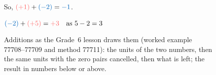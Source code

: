 \documentclass[11pt,a4paper]{article}
\theoremstyle{definition}
\newcommand\tribuNegative[2]{%
\begin{scope}[shift={(#1,#2)}]
\begin{scope}[scale=0.75]
\draw[fill=colorprop, thick] (0,0)circle(0.4);
\draw[ thick] (-0.15,0)--(0.15,0);
\end{scope}
\end{scope}
}
\newcommand\tribuPositive[2]{%

\begin{scope}[shift={(#1,#2)}]
\begin{scope}[scale=0.75]
\draw[fill=colordef, thick] (0,0)circle(0.4);
\draw[ thick] (0,-0.15)--(0,0.15);
\draw[ thick] (-0.15,0)--(0.15,0);
\end{scope}
\end{scope}
}
\newcommand\explosionForce[2]{
\begin{scope}[shift={(#1,#2)}]
  \shade[inner color=colorprop, outer color=colordef] (0,0) circle (0.3);
 \end{scope}
}
\newcommand\additionRelativeNumber[2]{
\pgfmathsetmacro{\numberFirst}{#1}
\pgfmathsetmacro{\numberFirstAbs}{int(abs(\numberFirst)}

\pgfmathsetmacro{\numberSecond}{#2}
\pgfmathsetmacro{\numberSecondAbs}{int(abs(\numberSecond)}


\pgfmathparse{ifthenelse(\numberFirst*\numberSecond>0,1,0)} 
\ifthenelse{\pgfmathresult=1}
{

\foreach \x in {1,...,\numberFirstAbs}  {
\pgfmathparse{ifthenelse(\numberFirst>0,1,0)} \ifthenelse{\pgfmathresult=1}{ 
\tribuPositive{\x*0.75}{0};
}
{
\tribuNegative{\x*0.75}{0};
}
}
\node at (\numberFirstAbs*0.75+0.65,0){$+$};

\foreach \x in {1,...,\numberSecondAbs}  {
\pgfmathsetmacro{\translateX}{(\x+\numberFirstAbs)*0.75+0.5}
\pgfmathparse{ifthenelse(\numberFirst>0,1,0)} \ifthenelse{\pgfmathresult=1}{ 
\tribuPositive{\translateX}{0};
}
{
\tribuNegative{\translateX}{0};
}
}

\node at ( {\numberFirstAbs*0.75+\numberSecondAbs*0.75+1.1},0){$=$};

\pgfmathparse{int(\numberFirstAbs+\numberSecondAbs)}
\foreach \x in {1,...,\pgfmathresult}  {
\pgfmathsetmacro{\translateX}{(\numberFirstAbs+\numberSecondAbs+\x)*0.75+0.95}
\pgfmathparse{ifthenelse(\numberFirst>0,1,0)} \ifthenelse{\pgfmathresult=1}{ 
\tribuPositive{\translateX}{0};
}
{
\tribuNegative{\translateX}{0};
}

}

}
{


\pgfmathparse{int(\numberFirst!=0)}
\ifthenelse{\pgfmathresult = 1}{
\foreach \x in {1,...,\numberFirstAbs}  {

\pgfmathsetmacro{\translateX}{(\x)*0.75}
\pgfmathparse{ifthenelse(\numberFirst>0,1,0)} 
\ifthenelse{\pgfmathresult=1}{
  \tribuPositive{\translateX}{0};
}{
  \tribuNegative{\translateX}{0};
}
}
}{}

\node at (\numberFirstAbs*0.75+0.65,0){$+$};

\pgfmathparse{int(\numberSecond!=0)}
\ifthenelse{\pgfmathresult = 1}{
\foreach \x in {1,...,\numberSecondAbs}  {

\pgfmathsetmacro{\translateX}{(\x+\numberFirstAbs)*0.75+0.5}
\pgfmathparse{ifthenelse(\numberSecond>0,1,0)} 
\ifthenelse{\pgfmathresult=1}{
  \tribuPositive{\translateX}{0};
}{
  \tribuNegative{\translateX}{0};
}
}}{}

\node at ( {\numberFirstAbs*0.75+\numberSecondAbs*0.75+1.1},0){$=$};


\pgfmathparse{ifthenelse(abs(abs(\numberFirst)-abs(\numberSecond))>0,1,0)} 
\ifthenelse{\pgfmathresult=1}{


\node at ( {\numberFirstAbs*0.75+\numberSecondAbs*0.75+1.1},-1){$=$};
\pgfmathsetmacro{\translateX}{(\numberFirstAbs+\numberSecondAbs)*0.75+0.95}




\pgfmathparse{ifthenelse(\numberFirst+\numberSecond>0,1,0)} 
\ifthenelse{\pgfmathresult=1}{
\pgfmathparse{abs(abs(\numberFirst)-abs(\numberSecond))} 
\foreach \x in {1,...,\pgfmathresult}  {
\tribuPositive{\translateX+\x*0.75}{0};
\tribuPositive{\translateX+\x*0.75}{-1};
}
\pgfmathparse{max(abs(\numberFirst),abs(\numberSecond))-abs(abs(\numberFirst)-abs(\numberSecond))} 
\foreach \x in {1,...,\pgfmathresult}  {
\pgfmathsetmacro{\translateX}{(\numberFirstAbs+\numberSecondAbs+abs(abs(\numberFirst)-abs(\numberSecond)))*0.75+0.95}
\explosionForce{\translateX+\x*0.75}{0};
}
}
{
\pgfmathparse{abs(abs(\numberFirst)-abs(\numberSecond))} 
\foreach \x in {1,...,\pgfmathresult}  {
\tribuNegative{\translateX+\x*0.75}{0};
\tribuNegative{\translateX+\x*0.75}{-1};
}
\pgfmathparse{max(abs(\numberFirst),abs(\numberSecond))-abs(abs(\numberFirst)-abs(\numberSecond))} 
\foreach \x in {1,...,\pgfmathresult}  {

\pgfmathsetmacro{\translateX}{(\numberFirstAbs+\numberSecondAbs+abs(abs(\numberFirst)-abs(\numberSecond)))*0.75+0.95}
\explosionForce{\translateX+\x*0.75}{0};
}
}
}
{
\pgfmathsetmacro{\translateX}{(\numberFirstAbs+\numberSecondAbs)*0.75+0.95}
\pgfmathparse{abs(\numberFirst)} 
\foreach \x in {1,...,\pgfmathresult}  {
\explosionForce{\translateX+\x*0.75}{0};
}
}
}
}
\begin{document}
\begin{figure}[htbp]
\centering
{}

\smallskip
So, $\textcolor{colordef}{(+1)}+\textcolor{colorprop}{(-2)}=\textcolor{colorprop}{-1}$.

\bigskip
$\textcolor{colorprop}{(-2)}+\textcolor{colordef}{(+5)}=\textcolor{colordef}{+3} \quad \text{as }5-2=3$\\[4pt]
\caption{Additions as the Grade~6 lesson draws them (worked example 77708--77709 and method 77711): the units of the two numbers, then the same units with the zero pairs cancelled, then what is left; the result in numbers below or above.}
\label{fig:addition}
\end{figure}
\end{document}
